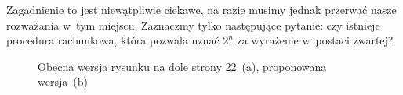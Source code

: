 \documentclass[a4paper,11pt]{article}
\numberwithin{equation}{section}
\newtheorem{theorem}{Twierdzenie}
\begin{document}
Zagadnienie to jest niewątpliwie ciekawe, na razie musimy jednak przerwać
nasze rozważania w~tym miejscu. Zaznaczmy tylko następujące pytanie:
czy istnieje procedura rachunkowa, która pozwala uznać $2^{ n }$ za
wyrażenie w~postaci zwartej?








\begin{figure}[h]

  \label{fig:Leja-Funkcje-zespolone-01}

  \centering



  \caption{Obecna wersja rysunku na dole strony 22~(a), proponowana
    wersja~(b)}


\end{figure}















\end{document}
